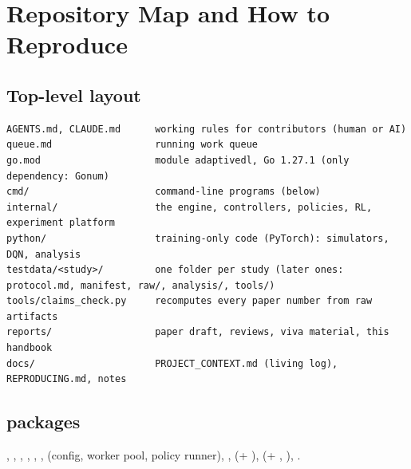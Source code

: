 \chapter{Repository Map and How to Reproduce}\label{app:repo}

\section{Top-level layout}
\begin{lstlisting}
AGENTS.md, CLAUDE.md      working rules for contributors (human or AI)
queue.md                  running work queue
go.mod                    module adaptivedl, Go 1.27.1 (only dependency: Gonum)
cmd/                      command-line programs (below)
internal/                 the engine, controllers, policies, RL, experiment platform
python/                   training-only code (PyTorch): simulators, DQN, analysis
testdata/<study>/         one folder per study (later ones: protocol.md, manifest, raw/, analysis/, tools/)
tools/claims_check.py     recomputes every paper number from raw artifacts
reports/                  paper draft, reviews, viva material, this handbook
docs/                     PROJECT_CONTEXT.md (living log), REPRODUCING.md, notes
\end{lstlisting}

\section{ packages}
, , , , , ,  (config, worker pool, policy runner), ,  (+ ),  (+ , ), .

